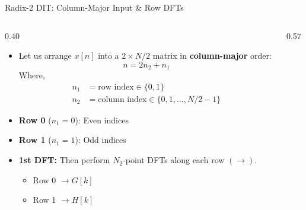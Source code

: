 \begin{frame}{Radix-2 DIT: Column-Major Input \& Row DFTs}
    \begin{columns}[T]
        \begin{column}{0.40\textwidth}
            \begin{itemize}
                \item Let us arrange $x[n]$ into a $2 \times N/2$ matrix in \textbf{column-major} order:
                      \begin{equation*}
                          n = 2n_2 + n_1
                      \end{equation*}
                      {
                      \footnotesize
                      Where,
                      \begin{align*}
                          n_1 & = \text{row index} \in \{0, 1\}                  \\
                          n_2 & = \text{column index} \in \{0, 1, \dots, N/2-1\}
                      \end{align*}
                      }
                      \vspace{-0.3cm}
                \item \textcolor{PrimaryColor}{\textbf{Row 0}} ($n_1\!=\!0$): \textcolor{PrimaryColor}{Even} indices
                \item \textcolor{SecondaryColor}{\textbf{Row 1}} ($n_1\!=\!1$): \textcolor{SecondaryColor}{Odd} indices
                \item \textbf{1st DFT:} Then perform $N_2$-point DFTs along each row $(\rightarrow)$.
                      \begin{itemize}
                          \item Row 0 $\to G[k]$
                          \item Row 1 $\to H[k]$
                      \end{itemize}
            \end{itemize}
        \end{column}
        \begin{column}{0.57\textwidth}
            \centering
            \vspace{0.2cm}
\end{column}
\end{columns}
\end{frame}
